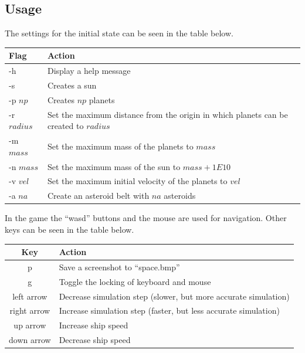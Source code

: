 \documentclass[a4paper,12pt]{article}
\begin{document}
\subsection{Usage}
The settings for the initial state can be seen in the table below.
\begin{center}
        \begin{tabular}{| l | p{9cm} |}
                \hline
                \textbf{Flag} & \textbf{Action} \\
                \hline
                -h & Display a help message \\
                -s & Creates a sun \\
                -p $np$ & Creates $np$ planets \\
                -r $radius$ & Set the maximum distance from the origin in which
                planets can be created to $radius$\\
                -m $mass$ & Set the maximum mass of the planets to $mass$\\
                -n $mass$ & Set the maximum mass of the sun to $mass + 1E10$ \\
-v $vel$ & Set the maximum initial velocity of the planets to $vel$ \\
                -a $na$ & Create an asteroid belt with $na$ asteroids \\
                \hline
        \end{tabular}
\end{center}

In the game the ``wasd'' buttons and the mouse are used for navigation.
Other keys can be seen in the table below.
\begin{center}
        \begin{tabular}{|c|l|}
                \hline
                \textbf{Key} & \textbf{Action} \\
                \hline
                p & Save a screenshot to ``space.bmp'' \\
                g & Toggle the locking of keyboard and mouse \\
                left arrow & Decrease simulation step (slower, but more accurate simulation) \\
                right arrow & Increase simulation step (faster, but less accurate simulation) \\
                up arrow & Increase ship speed \\
                down arrow & Decrease ship speed \\
                \hline
        \end{tabular}
\end{center}
\end{document}
